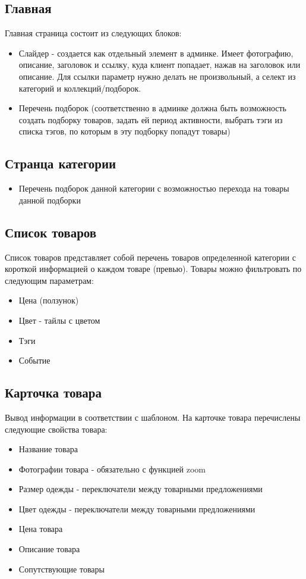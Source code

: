 \documentclass[DIV=calc, paper=a4, fontsize=11pt]{scrartcl} %
\begin{document}
\subsection{Главная}
Главная страница состоит из следующих блоков:
\begin{itemize}
	\item Слайдер - создается как отдельный элемент в админке. Имеет фотографию, описание, заголовок и ссылку, куда клиент попадает, нажав на заголовок или описание. Для ссылки параметр нужно делать не произвольный, а селект из категорий и коллекций/подборок.
	\item Перечень подборок (соответственно в админке должна быть возможность создать подборку товаров, задать ей период активности, выбрать тэги из списка тэгов, по которым в эту подборку попадут товары)
\end{itemize}

\subsection{Странца категории}
\begin{itemize}
	\item Перечень подборок данной категории с возможностью перехода на товары данной подборки
\end{itemize}


\subsection{Список товаров}
Список товаров представляет собой перечень товаров определенной категории с короткой информацией о каждом товаре (превью). Товары можно фильтровать по следующим параметрам:

\begin{itemize}
	\item Цена (ползунок)
	\item Цвет - тайлы с цветом
	\item Тэги
	\item Событие
\end{itemize}

\subsection{Карточка товара}
Вывод информации в соответствии с шаблоном. На карточке товара перечислены следующие свойства товара:

\begin{itemize}
	\item Название товара
	\item Фотографии товара - обязательно с функцией zoom
	\item Размер одежды - переключатели между товарными предложениями
	\item Цвет одежды - переключатели между товарными предложениями
	\item Цена товара
	\item Описание товара
	\item Сопутствующие товары
\end{itemize}
\end{document}
